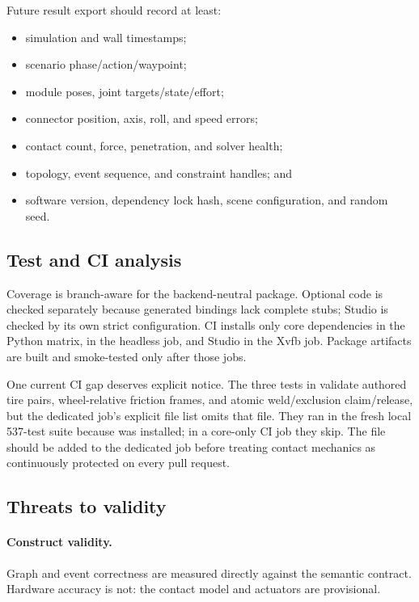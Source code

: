 Future result export should record at least:

\begin{itemize}
  \item simulation and wall timestamps;
  \item scenario phase/action/waypoint;
  \item module poses, joint targets/state/effort;
  \item connector position, axis, roll, and speed errors;
  \item contact count, force, penetration, and solver health;
  \item topology, event sequence, and constraint handles; and
  \item software version, dependency lock hash, scene configuration, and random seed.
\end{itemize}

\subsection{Test and CI analysis}

Coverage is branch-aware for the backend-neutral package. Optional \mujoco{} code is
checked separately because generated bindings lack complete stubs; Studio is checked by
its own strict configuration. CI installs only core dependencies in the Python matrix,
\mujoco{} in the headless job, and Studio in the Xvfb job. Package artifacts are built
and smoke-tested only after those jobs.

One current CI gap deserves explicit notice. The three tests in
 validate authored tire pairs,
wheel-relative friction frames, and atomic weld/exclusion claim/release, but the
dedicated \mujoco{} job's explicit file list omits that file. They ran in the fresh local
537-test suite because \mujoco{} was installed; in a core-only CI job they skip. The file
should be added to the dedicated job before treating contact mechanics as continuously
protected on every pull request.

\subsection{Threats to validity}

\paragraph{Construct validity.}
Graph and event correctness are measured directly against the semantic contract.
Hardware accuracy is not: the contact model and actuators are provisional.

